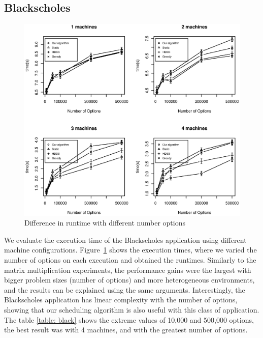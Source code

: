 \documentclass[journal]{IEEEtran}
\begin{document}
\subsection{Blackscholes}

\begin{figure}[htb]
	\begin{center}
	\centering
			\includegraphics[scale=0.45]{BlackScholes4Machines.eps}
	\caption{Difference in runtime with different number options}
	\label{fig:black}
	\end{center}
\end{figure}

We evaluate the execution time of the Blackscholes application using different
machine configurations. Figure~\ref{fig:black} shows the execution times, where
we varied the number of options on each execution and obtained the
runtimes. Similarly to the matrix multiplication experiments, the performance
gains were the largest with bigger problem sizes (number of options) and more
heterogeneous environments, and the results can be explained using the same
arguments. Interestingly, the Blackscholes application has linear complexity
with the number of options, showing that our scheduling algorithm is also useful
with this class of application. The table \ref{table: black} shows the extreme values ​​of 10,000 and 500,000 options, the best result was with 4 machines, and with the greatest number of options.
\end{document}
